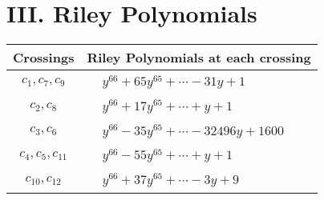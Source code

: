 \documentclass[1p]{elsarticle_modified}
\theoremstyle{definition}
\begin{document}
\centering \section*{ III. Riley Polynomials}
\begin{tabular}{m{50pt}|m{274pt}}
Crossings & \hspace{64pt}Riley Polynomials at each crossing \\
\hline $$\begin{aligned}c_{1},c_{7},c_{9}\end{aligned}$$&$\begin{aligned}
&y^{66}+65 y^{65}+\cdots-31 y+1
\end{aligned}$\\
\hline $$\begin{aligned}c_{2},c_{8}\end{aligned}$$&$\begin{aligned}
&y^{66}+17 y^{65}+\cdots+y+1
\end{aligned}$\\
\hline $$\begin{aligned}c_{3},c_{6}\end{aligned}$$&$\begin{aligned}
&y^{66}-35 y^{65}+\cdots-32496 y+1600
\end{aligned}$\\
\hline $$\begin{aligned}c_{4},c_{5},c_{11}\end{aligned}$$&$\begin{aligned}
&y^{66}-55 y^{65}+\cdots+y+1
\end{aligned}$\\
\hline $$\begin{aligned}c_{10},c_{12}\end{aligned}$$&$\begin{aligned}
&y^{66}+37 y^{65}+\cdots-3 y+9
\end{aligned}$\\
\hline
\end{tabular}
\vskip 2pc
\end{document}
